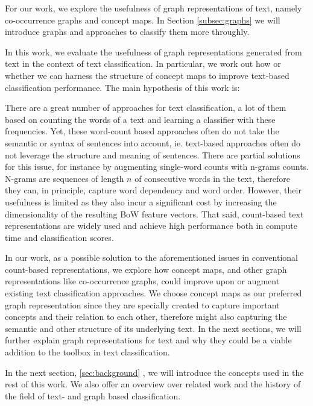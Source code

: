 For our work, we explore the usefulness of graph representations of text, namely co-occurrence graphs and concept maps.
In Section \ref{subsec:graphs} we will introduce graphs and approaches to classify them more throughly.

In this work, we evaluate the usefulness of graph representations generated from text in the context of text classification. In particular, we work out how or whether we can harness the structure of concept maps to improve text-based classification performance.
The main hypothesis of this work is:
\begin{quote}
\hypothesis
\end{quote}

There are a great number of approaches for text classification, a lot of them based on counting the words of a text and learning a classifier with these frequencies.
Yet, these word-count based approaches often do not take the semantic or syntax of sentences into account, ie. text-based approaches often do not leverage the structure and meaning of sentences.
There are partial solutions for this issue, for instance by augmenting single-word counts with n-grams \cite[p.~191]{Manning2000} counts.
N-grams are sequences of length $n$ of consecutive words in the text, therefore they can, in principle, capture word dependency and word order.
However, their usefulness is limited as they also incur a significant cost by increasing the dimensionality of the resulting BoW feature vectors.
That said, count-based text representations are widely used and achieve high performance both in compute time and classification scores.

In our work, as a possible solution to the aforementioned issues in conventional count-based representations, we explore how concept maps, and other graph representations like co-occurrence graphs, could improve upon or augment existing text classification approaches.
We choose concept maps as our preferred graph representation since they are specially created to capture important concepts and their relation to each other, therefore might also capturing the semantic and other structure of its underlying text.
In the next sections, we will further explain graph representations for text and why they could be a viable addition to the toolbox in text classification.

In the next section, \ref{sec:background} , we will introduce the concepts used in the rest of this work.
We also offer an overview over related work and the history of the field of text- and graph based classification.


